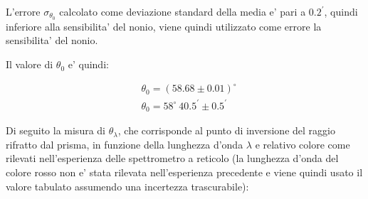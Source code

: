 L'errore $\sigma_{\theta_0}$ calcolato come deviazione standard della media e' pari a $0.2^{\prime}$, quindi inferiore alla sensibilita' del nonio, viene quindi utilizzato come errore la sensibilita' del nonio.

Il valore di $\theta_0$ e' quindi:

    \begin{align*}
        &\theta_0 = (58.68 \pm 0.01)^{\circ} \\
        &\theta_0 = 58^{\circ} \ 40.5^{\prime} \pm 0.5^{\prime}
    \end{align*}


Di seguito la misura di $\theta_{\lambda}$, che corrisponde al punto di inversione del raggio rifratto dal prisma, in funzione della lunghezza d'onda $\lambda$ e relativo colore come rilevati nell'esperienza delle spettrometro a reticolo (la lunghezza d'onda del colore rosso non e' stata rilevata nell'esperienza precedente e viene quindi usato il valore tabulato assumendo una incertezza trascurabile):

